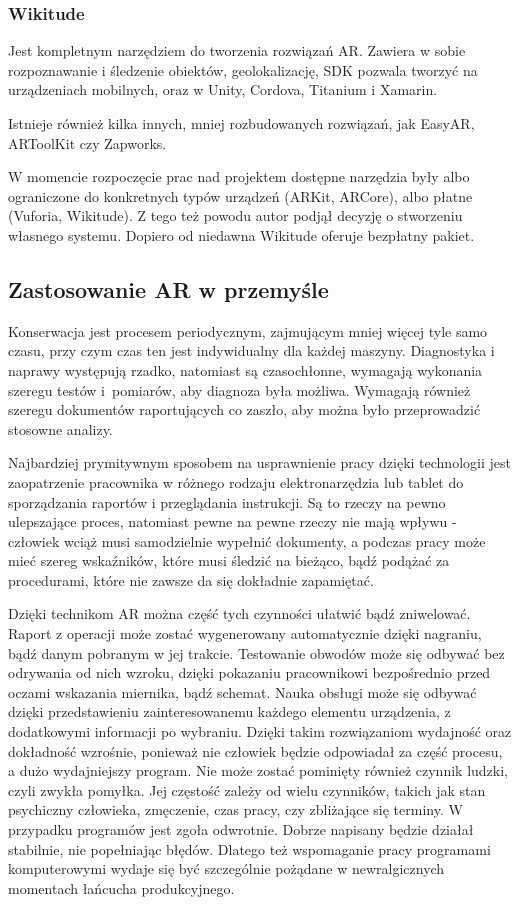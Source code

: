 \documentclass[12pt,twoside,polish]{article}
\begin{document}
\subsubsection*{Wikitude}
Jest kompletnym narzędziem do tworzenia rozwiązań AR. Zawiera w sobie rozpoznawanie i śledzenie obiektów, geolokalizację, SDK pozwala tworzyć na urządzeniach mobilnych, oraz w Unity, Cordova, Titanium i Xamarin.

\vspace{5mm}

Istnieje również kilka innych, mniej rozbudowanych rozwiązań, jak EasyAR, ARToolKit czy Zapworks.

W momencie rozpoczęcie prac nad projektem dostępne narzędzia były albo ograniczone do konkretnych typów urządzeń (ARKit, ARCore), albo płatne (Vuforia, Wikitude). Z tego też powodu autor podjął decyzję o stworzeniu własnego systemu. Dopiero od niedawna Wikitude oferuje bezpłatny pakiet.


\subsection{Zastosowanie AR w przemyśle}
\label{section:implementations}
Konserwacja jest procesem periodycznym, zajmującym mniej więcej tyle samo czasu, przy czym czas ten jest indywidualny dla każdej maszyny. Diagnostyka i naprawy występują rzadko, natomiast są czasochłonne, wymagają wykonania szeregu testów i~pomiarów, aby diagnoza była możliwa. Wymagają również szeregu dokumentów raportujących co zaszło, aby można było przeprowadzić stosowne analizy.

Najbardziej prymitywnym sposobem na usprawnienie pracy dzięki technologii jest zaopatrzenie pracownika w różnego rodzaju elektronarzędzia lub tablet do sporządzania raportów i przeglądania instrukcji. Są to rzeczy na pewno ulepszające proces, natomiast pewne na pewne rzeczy nie mają wpływu - człowiek wciąż musi samodzielnie wypełnić dokumenty, a podczas pracy może mieć szereg wskaźników, które musi śledzić na bieżąco, bądź podążać za procedurami, które nie zawsze da się dokładnie zapamiętać.

Dzięki technikom AR można część tych czynności ułatwić bądź zniwelować. Raport z operacji może zostać wygenerowany automatycznie dzięki nagraniu, bądź danym pobranym w jej trakcie. Testowanie obwodów może się odbywać bez odrywania od nich wzroku, dzięki pokazaniu pracownikowi bezpośrednio przed oczami wskazania miernika, bądź schemat. Nauka obsługi może się odbywać dzięki przedstawieniu zainteresowanemu każdego elementu urządzenia, z dodatkowymi informacji po wybraniu. Dzięki takim rozwiązaniom wydajność oraz dokładność wzrośnie, ponieważ nie człowiek będzie odpowiadał za część procesu, a dużo wydajniejszy program. Nie może zostać pominięty również czynnik ludzki, czyli zwykła pomyłka. Jej częstość zależy od wielu czynników, takich jak stan psychiczny człowieka, zmęczenie, czas pracy, czy zbliżające się terminy. W przypadku programów jest zgoła odwrotnie. Dobrze napisany będzie działał stabilnie, nie popełniając błędów. Dlatego też wspomaganie pracy programami komputerowymi wydaje się być szczególnie pożądane w newralgicznych momentach łańcucha produkcyjnego.
\end{document}
